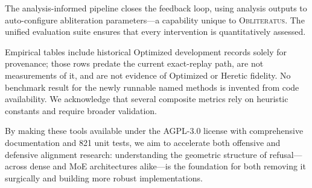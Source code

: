 \documentclass[11pt]{article}
\begin{document}
The analysis-informed pipeline closes the feedback loop, using analysis outputs to auto-configure abliteration parameters---a capability unique to \textsc{Obliteratus}. The unified evaluation suite ensures that every intervention is quantitatively assessed.

Empirical tables include historical Optimized development records solely for provenance; those rows predate the current exact-replay path, are not measurements of it, and are not evidence of Optimized or Heretic fidelity. No benchmark result for the newly runnable named methods is invented from code availability. We acknowledge that several composite metrics rely on heuristic constants and require broader validation.

By making these tools available under the AGPL-3.0 license with comprehensive documentation and 821 unit tests, we aim to accelerate both offensive and defensive alignment research: understanding the geometric structure of refusal---across dense and MoE architectures alike---is the foundation for both removing it surgically and building more robust implementations.



\end{document}
